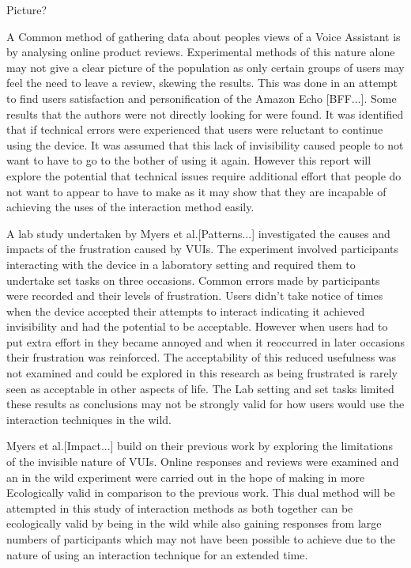\documentclass{l4proj}
\begin{document}
Picture?

A Common method of gathering data about peoples views of a Voice Assistant is by analysing online product reviews. Experimental methods of this nature alone may not give a clear picture of the population as only certain groups of users may feel the need to leave a review, skewing the results. This was done in an attempt to find users satisfaction and personification of the Amazon Echo [BFF...]. Some results that the authors were not directly looking for were found. It was identified that if technical errors were experienced that users were reluctant to continue using the device. It was assumed that this lack of invisibility caused people to not want to have to go to the bother of using it again. However this report will explore the potential that technical issues require additional effort that people do not want to appear to have to make as it may show that they are incapable of achieving the uses of the interaction method easily.

A lab study undertaken by Myers et al.[Patterns...] investigated the causes and impacts of the frustration caused by VUIs. The experiment involved participants interacting with the device in a laboratory setting and required them to undertake set tasks on three occasions. Common errors made by participants were recorded and their levels of frustration. Users didn't take notice of times when the device accepted their attempts to interact indicating it achieved invisibility and had the potential to be acceptable. However when users had to put extra effort in they became annoyed and when it reoccurred in later occasions their frustration was reinforced. The acceptability of this reduced usefulness was not examined and could be explored in this research as being frustrated is rarely seen as acceptable in other aspects of life. The Lab setting and set tasks limited these results as conclusions may not be strongly valid for how users would use the interaction techniques in the wild.

Myers et al.[Impact...] build on their previous work by exploring the limitations of the invisible nature of VUIs. Online responses and reviews were examined and an in the wild experiment were carried out in the hope of making in more Ecologically valid in comparison to the previous work. This dual method will be attempted in this study of interaction methods as both together can be ecologically valid by being in the wild while also gaining responses from large numbers of participants which may not have been possible to achieve due to the nature of using an interaction technique for an extended time.
\end{document}
